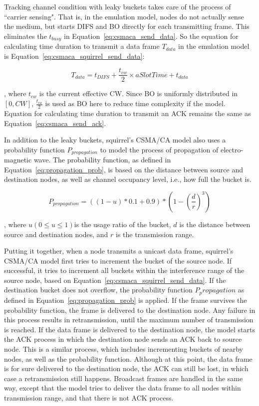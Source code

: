 \documentclass[12pt]{report}
\begin{document}
Tracking channel condition with leaky buckets takes care of the process of ``carrier sensing". That is, in the emulation model, nodes do not actually sense the medium, but starts DIFS and BO directly for each transmitting frame. This eliminates the $t_{busy}$ in Equation~\ref{eq:csmaca_send_data}. So the equation for calculating time duration to transmit a data frame $T_{data}$ in the emulation model is Equation~\ref{eq:csmaca_squirrel_send_data}:

\begin{equation}
  T_{data}=t_{DIFS}+\frac{t_{cw}}{2}\times aSlotTime+t_{data}
  \label{eq:csmaca_squirrel_send_data}
\end{equation}

, where $t_{cw}$ is the current effective CW. Since BO is uniformly distributed in $[0,CW]$, $\frac{t_{cw}}{2}$ is used as BO here to reduce time complexity if the model. Equation for calculating time duration to transmit an ACK remains the same as Equation~\ref{eq:csmaca_send_ack}.

In addition to the leaky buckets, squirrel's CSMA/CA model also uses a probability function $P_{propagation}$ to model the process of propagation of electro-magnetic wave. The probability function, as defined in Equation~\ref{eq:propagation_prob}, is based on the distance between source and destination nodes, as well as channel occupancy level, i.e., how full the bucket is.

\begin{equation}
  P_{propagation}=((1-u) * 0.1 + 0.9) * (1-(\frac{d}{r})^3)
  \label{eq:propagation_prob}
\end{equation}

, where $u(0\le u\le 1)$is the usage ratio of the bucket, $d$ is the distance between source and destination nodes, and $r$ is the transmission range.

Putting it together, when a node transmits a unicast data frame, squirrel's CSMA/CA model first tries to increment the bucket of the source node. If successful, it tries to increment all buckets within the interference range of the source node, based on Equation~\ref{eq:csmaca_squirrel_send_data}. If the destination bucket does not overflow, the probability function $P_propagation$ as defined in Equation~\ref{eq:propagation_prob} is applied. If the frame survives the probability function, the frame is delivered to the destination node. Any failure in this process results in retransmission, until the maximum number of transmission is reached. If the data frame is delivered to the destination node, the model starts the ACK process in which the destination node sends an ACK back to source node. This is a similar process, which includes incrementing buckets of nearby nodes, as well as the probability function. Although at this point, the data frame is for sure delivered to the destination node, the ACK can still be lost, in which case a retransmission still happens. Broadcast frames are handled in the same way, except that the model tries to deliver the data frame to all nodes within transmission range, and that there is not ACK process.
\end{document}
